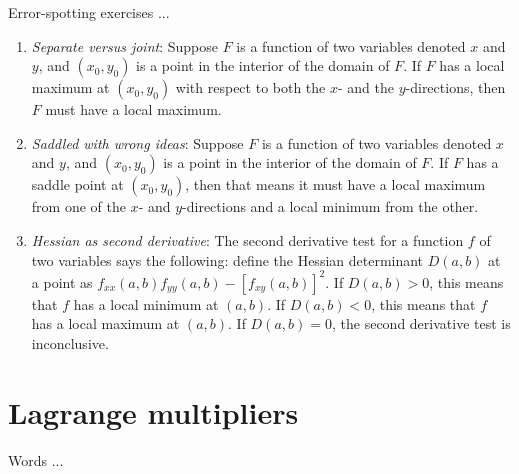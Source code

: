 \documentclass[10pt]{amsart}
\begin{document}
Error-spotting exercises ...

\begin{enumerate}
\item {\em Separate versus joint}: Suppose $F$ is a function of two
  variables denoted $x$ and $y$, and $(x_0,y_0)$ is a point in the
  interior of the domain of $F$. If $F$ has a local maximum at
  $(x_0,y_0)$ with respect to both the $x$- and the $y$-directions,
  then $F$ must have a local maximum.
\item {\em Saddled with wrong ideas}: Suppose $F$ is a function of two
  variables denoted $x$ and $y$, and $(x_0,y_0)$ is a point in the
  interior of the domain of $F$. If $F$ has a saddle point at
  $(x_0,y_0)$, then that means it must have a local maximum from one
  of the $x$- and $y$-directions and a local minimum from the other.
\item {\em Hessian as second derivative}: The second derivative test
  for a function $f$ of two variables says the following: define the
  Hessian determinant $D(a,b)$ at a point as $f_{xx}(a,b)f_{yy}(a,b) -
  [f_{xy}(a,b)]^2$. If $D(a,b) > 0$, this means that $f$ has a local
  minimum at $(a,b)$. If $D(a,b) < 0$, this means that $f$ has a local
  maximum at $(a,b)$. If $D(a,b) = 0$, the second derivative test is
  inconclusive.
\end{enumerate}
\section{Lagrange multipliers}

Words ...
\end{document}
